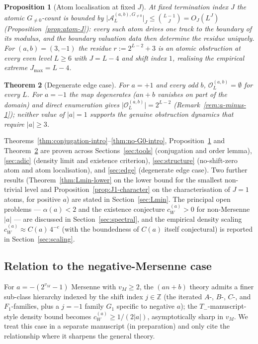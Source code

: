 \documentclass[11pt,reqno]{amsart}
\theoremstyle{plain}
\newtheorem{theorem}{Theorem}[section]
\newtheorem{proposition}[theorem]{Proposition}
\theoremstyle{definition}
\theoremstyle{remark}
\newcommand{\Tneg}{T_{-}}
\newcommand{\Z}{\mathbb{Z}}
\newcommand{\Obs}{\mathcal{O}}
\newcommand{\Atom}{\mathcal{A}}
\newcommand{\cWa}{c_{W}^{(a)}}
\newcommand{\Obsab}{\Obs_{L}^{(a,b)}}
\begin{document}
\begin{proposition}[Atom localisation at fixed $J$]\label{prop:atom-J-intro}
At fixed termination index $J$ the atomic $G_{\ne 0}$-count is bounded by
$\lvert \Atom_L^{(a,b), G_{\ne 0}} \rvert_J \le \binom{L-1}{J} = O_J(L^{J})$
(Proposition~\ref{prop:atom-J}): every such atom drives one track to the
boundary of its modulus, and the boundary valuation data then determine the
residue uniquely. For $(a,b) = (3,-1)$ the residue
$r := 2^{L-2} + 3$ is an atomic obstruction at every \emph{even} level
$L \ge 6$ with $J = L - 4$ and shift index $1$, realising the empirical
extreme $J_{\max} = L - 4$.
\end{proposition}

\begin{theorem}[Degenerate edge case]\label{thm:edge-intro}
For $a = +1$ and every odd $b$, $\Obsab = \emptyset$ for every $L$. For
$a = -1$ the map degenerates ($an + b$ vanishes on part of the domain)
and direct enumeration gives $\lvert \Obsab \rvert = 2^{L-2}$
(Remark~\ref{rem:a-minus-1}); neither value of $\lvert a \rvert
= 1$ supports the genuine obstruction dynamics that require $\lvert a
\rvert \ge 3$.
\end{theorem}

Theorems~\ref{thm:conjugation-intro}--\ref{thm:no-G0-intro},
Proposition~\ref{prop:atom-J-intro} and Theorem~\ref{thm:edge-intro} are proven
across Sections~\ref{sec:tools} (conjugation and order lemma),
\ref{sec:adic} (density limit and existence criterion),
\ref{sec:structure} (no-shift-zero atom
and atom localisation), and \ref{sec:edge} (degenerate edge case). Two further results
(Theorem~\ref{thm:Lmin-lower} on the lower bound for the smallest
non-trivial level and Proposition~\ref{prop:J1-character} on the
characterisation of $J = 1$ atoms, for positive $a$) are stated in
Section~\ref{sec:Lmin}.
The principal open problems --- $\alpha(a) < 2$ and the existence
conjecture $\cWa > 0$ for non-Mersenne
$\lvert a \rvert$ --- are discussed in Section~\ref{sec:spectral}, and the
empirical density scaling $\cWa \approx C(a)\,4^{-e}$ (with the
boundedness of $C(a)$ itself conjectural) is reported in
Section~\ref{sec:scaling}.

\subsection{Relation to the negative-Mersenne case}

For $a = -(2^{v_M} - 1)$ Mersenne with $v_M \ge 2$, the $(an+b)$ theory
admits a finer sub-class hierarchy indexed by the shift index $j \in
\Z$ (the iterated $A$-, $B$-, $C$-, and $F_1$-families, plus a
$j = -1$ family $G_1$ specific to negative $a$); the $\Tneg$-manuscript-style
density bound becomes $\cWa \ge 1/(2\lvert a \rvert)$, asymptotically
sharp in $v_M$. We treat this case in a separate manuscript (in
preparation) and only cite the relationship where it sharpens the general
theory.
\end{document}
